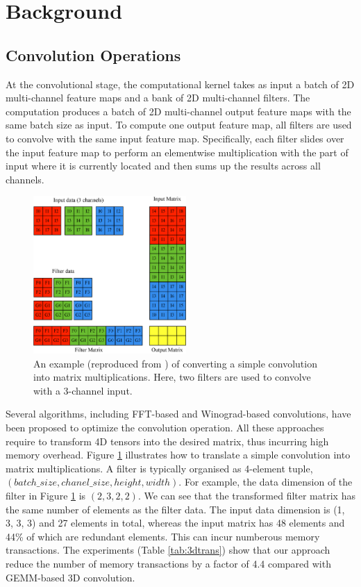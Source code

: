 
\section{Background}

\subsection{Convolution Operations}

At the convolutional stage, the computational kernel takes as input a batch of 2D multi-channel feature maps and a bank of  2D
multi-channel filters. The computation produces a batch of 2D multi-channel output feature maps with the same batch size as input. To
compute one output feature map, all filters are used to convolve with the same input feature map. Specifically, each filter slides over the
input feature map to perform an elementwise multiplication with the part of input where it is currently located and then sums up the
results across all channels.

\begin{figure}
\centering
  \includegraphics[width=0.75\columnwidth,height=6cm]{./figure/convlowering.eps}
  \caption{An example (reproduced from \cite{ChetlurWVCTCS14}) of converting a simple convolution into matrix multiplications. Here, two filters are used to convolve with a 3-channel input.}
  \label{fig:convlowering}
\end{figure}

{\color{red} Several algorithms, including FFT-based and Winograd-based convolutions, have been proposed to optimize the convolution
operation. All these approaches require to transform 4D tensors into the desired matrix, thus incurring high memory overhead. Figure
\ref{fig:convlowering} illustrates how to translate a simple convolution into matrix multiplications. A filter is typically organised as
4-element tuple, $(batch\_size, chanel\_size, height, width)$. For example, the data dimension of the filter in Figure
\ref{fig:convlowering} is $(2, 3, 2, 2)$. We can see that the transformed filter matrix has the same number of elements as the filter data.
The input data dimension is (1, 3, 3, 3) and 27 elements in total, whereas the input matrix has 48 elements and 44\% of which are redundant
elements. This can incur numberous memory transactions. The experiments (Table \ref{tab:3dtrans}) show that our approach reduce the number
of memory transactions by a factor of 4.4 compared with GEMM-based 3D convolution.}


